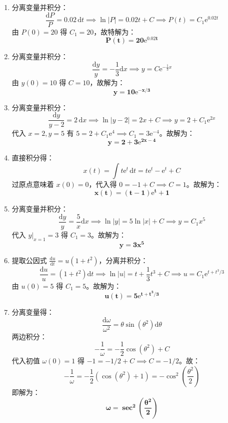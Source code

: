 \documentclass[lang=cn,11pt]{elegantbook}
\begin{document}
\begin{solution}
\begin{enumerate}
    \item[(1)] 分离变量并积分：
    \[
    \frac{\mathrm{d}P}{P} = 0.02\,\mathrm{d}t \implies \ln|P| = 0.02t + C \implies P(t) = C_1\mathrm{e}^{0.02t}
    \]
    由 $P(0)=20$ 得 $C_1=20$，故特解为：
    \[
    \mathbf{P(t) = 20\mathrm{e}^{0.02t}}
    \]
    
    \item[(2)] 分离变量并积分：
    \[
    \frac{\mathrm{d}y}{y} = -\frac{1}{3}\mathrm{d}x \implies y = C\mathrm{e}^{-\frac{1}{3}x}
    \]
    由 $y(0)=10$ 得 $C=10$，故解为：
    \[
    \mathbf{y = 10\mathrm{e}^{-x/3}}
    \]
    
    \item[(3)] 分离变量并积分：
    \[
    \frac{\mathrm{d}y}{y-2} = 2\,\mathrm{d}x \implies \ln|y-2| = 2x+C \implies y = 2+C_1\mathrm{e}^{2x}
    \]
    代入 $x=2, y=5$ 有 $5 = 2+C_1\mathrm{e}^{4} \implies C_1=3\mathrm{e}^{-4}$。故解为：
    \[
    \mathbf{y = 2+3\mathrm{e}^{2x-4}}
    \]
    
    \item[(4)] 直接积分得：
    \[
    x(t) = \int t\mathrm{e}^t\,\mathrm{d}t = t\mathrm{e}^t - \mathrm{e}^t + C
    \]
    过原点意味着 $x(0)=0$，代入得 $0 = -1+C \implies C=1$。故解为：
    \[
    \mathbf{x(t) = (t-1)\mathrm{e}^t + 1}
    \]
    
    \item[(5)] 分离变量并积分：
    \[
    \frac{\mathrm{d}y}{y} = \frac{5}{x}\mathrm{d}x \implies \ln|y| = 5\ln|x|+C \implies y = C_1x^5
    \]
    代入 $y|_{x=1}=3$ 得 $C_1=3$。故解为：
    \[
    \mathbf{y = 3x^5}
    \]
    
    \item[(6)] 提取公因式 $\displaystyle \frac{\mathrm{d}u}{\mathrm{d}t} = u(1+t^2)$，分离并积分：
    \[
    \frac{\mathrm{d}u}{u} = (1+t^2)\mathrm{d}t \implies \ln|u| = t+\frac{1}{3}t^3+C \implies u = C_1\mathrm{e}^{t+t^3/3}
    \]
    由 $u(0)=5$ 得 $C_1=5$。故解为：
    \[
    \mathbf{u(t) = 5\mathrm{e}^{t+t^3/3}}
    \]
    
    \item[(7)] 分离变量得：
    \[
    \frac{\mathrm{d}\omega}{\omega^2} = \theta\sin(\theta^2)\mathrm{d}\theta
    \]
    两边积分：
    \[
    -\frac{1}{\omega} = -\frac{1}{2}\cos(\theta^2)+C
    \]
    代入初值 $\omega(0)=1$ 得 $-1 = -1/2+C \implies C=-1/2$。故：
    \[
    -\frac{1}{\omega} = -\frac{1}{2}(\cos(\theta^2)+1) = -\cos^2\left(\frac{\theta^2}{2}\right)
    \]
    即解为：
    \[
    \mathbf{\omega = \sec^2\left(\frac{\theta^2}{2}\right)}
    \]
    

\end{enumerate}
\end{solution}
\end{document}
